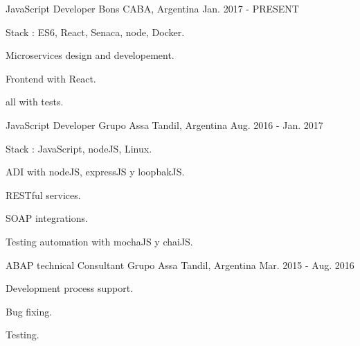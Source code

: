 


\begin{cventries}

\cventry
{ JavaScript Developer} %
{Bons} %
{CABA, Argentina} %
{Jan. 2017 - PRESENT} %
{ %
\begin{cvitems}
\item {Stack : ES6, React, Senaca, node, Docker.}
\item {Microservices design and developement.}
\item {Frontend with React.}
\item {all with tests.}
\end{cvitems}
}
\cventry
{ JavaScript Developer} %
{Grupo Assa} %
{Tandil, Argentina} %
{Aug. 2016 - Jan. 2017} %
{ %
\begin{cvitems}
\item {Stack : JavaScript, nodeJS, Linux.}
\item {ADI with nodeJS, expressJS y loopbakJS.}
\item {RESTful services.}
\item {SOAP integrations.}
\item {Testing automation with mochaJS y chaiJS.}
\end{cvitems}
}

\cventry
{ABAP technical Consultant} %
{Grupo Assa} %
{Tandil, Argentina} %
{Mar. 2015 - Aug. 2016} %
{ %
\begin{cvitems}
\item {Development process support.}
\item {Bug fixing.}
\item {Testing.}
\end{cvitems}
}

\end{cventries}
